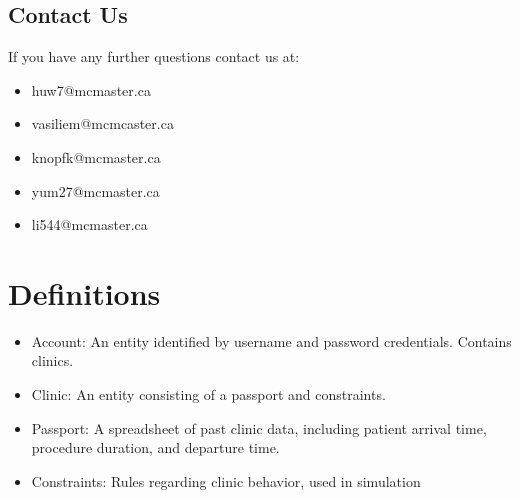 \documentclass[12pt]{article}
\begin{document}
\subsection{Contact Us}
If you have any further questions contact us at:
\begin{itemize}
\item huw7@mcmaster.ca
\item vasiliem@mcmcaster.ca
\item knopfk@mcmaster.ca
\item yum27@mcmaster.ca
\item li544@mcmaster.ca
\end{itemize}

\section{Definitions}
\begin{itemize}
\item Account:  An entity identified by username and password credentials. Contains clinics. 
\item Clinic: An entity consisting of a passport and constraints.
\item Passport: A spreadsheet of past clinic data, including patient arrival time, procedure duration, and departure time.
\item Constraints: Rules regarding clinic behavior, used in simulation
\end{itemize}
\end{document}

